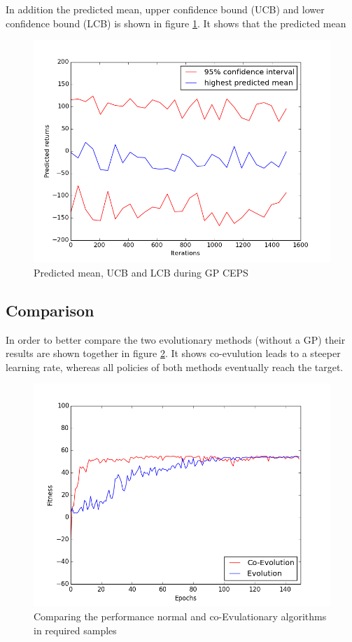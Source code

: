 In addition the predicted mean, upper confidence bound (UCB) and lower confidence bound (LCB) is shown in figure \ref{pred_img}. It shows that the predicted mean 

\begin{figure}[ht]
  \centering
  \includegraphics[scale=0.5]{images/GPCEPS_pred.png}
  \caption{Predicted mean, UCB and LCB during GP CEPS}\label{pred_img}
\end{figure}


\subsection{Comparison}\label{comparisonSection}
In order to better compare the two evolutionary methods (without a GP) their results are shown together in figure \ref{compare_img}. It shows co-evulution leads to a steeper learning rate, whereas all policies of both methods eventually reach the target.

\begin{figure}[ht]
  \centering
  \includegraphics[scale=0.5]{images/together.png}
  \caption{Comparing the performance normal and co-Evulationary algorithms in required samples}\label{compare_img}
\end{figure}


